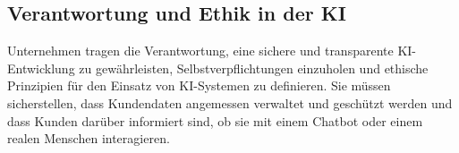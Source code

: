 \subsection{Verantwortung und Ethik in der KI}

Unternehmen tragen die Verantwortung, eine sichere und transparente KI-Entwicklung zu gewährleisten, Selbstverpflichtungen einzuholen und ethische Prinzipien für den Einsatz von KI-Systemen zu definieren. Sie müssen sicherstellen, dass Kundendaten angemessen verwaltet und geschützt werden und dass Kunden darüber informiert sind, ob sie mit einem Chatbot oder einem realen Menschen interagieren.\citep{ai-res-cmm360}
